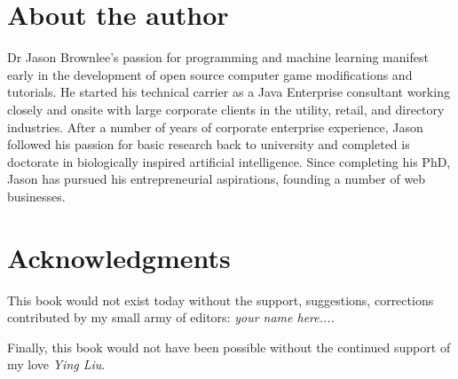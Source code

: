 \section*{About the author}
Dr Jason Brownlee's passion for programming and machine learning manifest early in the development of open source computer game modifications and tutorials. He started his technical carrier as a Java Enterprise consultant working closely and onsite with large corporate clients in the utility, retail, and directory industries. After a number of years of corporate enterprise experience, Jason followed his passion for basic research back to university and completed is doctorate in biologically inspired artificial intelligence. Since completing his PhD, Jason has pursued his entrepreneurial aspirations, founding a number of web businesses.

\section*{Acknowledgments}
This book would not exist today without the support, suggestions, corrections contributed by my small army of editors: \textit{your name here...}. 

Finally,  this book would not have been possible without the continued support of my love \textit{Ying Liu}. 
